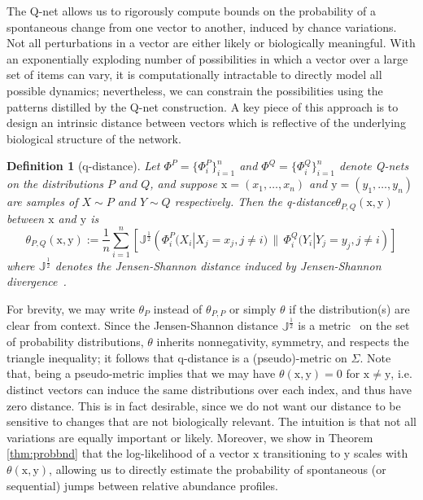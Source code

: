 \documentclass[onecolumn,10pt]{IEEEtran}
\newtheorem{defn}{Definition}
\def\x{\bm{\mathrm{x}}}
\def\y{\bm{\mathrm{y}}}
\def\qnet{Q-net\xspace}
\def\qdist{q-distance\xspace}
\def\x{\bm{\mathrm{x}}}
\def\y{\bm{\mathrm{y}}}
\begin{document}
The \qnet allows us to rigorously compute  bounds on  the probability of a spontaneous change from one vector to another, induced by chance variations. Not all perturbations in a vector are either likely or biologically meaningful. With an exponentially exploding number of possibilities in which a vector over a large set of items can vary, it is computationally intractable to directly model all possible dynamics; nevertheless, we can constrain the possibilities using the patterns distilled by the \qnet construction.  A key piece of this approach is to design  an intrinsic distance between vectors which is reflective of the underlying biological structure of the network.  

\begin{defn}[\qdist]
\label{defqdistance}
Let $\Phi^P = \{\Phi_i^P\}_{i=1}^n$ and $\Phi^Q = \{\Phi_i^Q\}_{i=1}^n$ denote {\qnet}s on the distributions $P$ and $Q$, and suppose $\x=(x_1, \ldots, x_n)$ and $\y =(y_1, \ldots, y_n)$ are samples of $X \sim P$ and $Y \sim Q$ respectively. Then the \qdist $\theta_{P,Q}(\x,\y)$ between $\x$ and $\y$ is\[\theta_{P,Q}(\x,\y) := \frac{1}{n}\sum_{i=1}^n \left[ \mathbb{J}^{\frac{1}{2}} \left(\Phi_i^P(X_i |X_j = x_j, j \neq i) \,\|\, \Phi_i^Q(Y_i|Y_j = y_j, j \neq i\right ) \right]\]%
where $\mathbb{J}^{\frac{1}{2}}$ denotes the Jensen-Shannon distance induced by Jensen-Shannon divergence~\cite{cover1991elements}.
\end{defn}

For brevity, we may write $\theta_P$ instead of $\theta_{P,P}$ or simply $\theta$ if the distribution(s) are clear from context.  Since the Jensen-Shannon distance $\mathbb{J}^{\frac{1}{2}}$ is a metric~\cite{fuglede2004jensen} on the set of probability distributions, $\theta$ inherits nonnegativity, symmetry, and respects the triangle inequality; it follows that \qdist is a (pseudo)-metric on $\Sigma$. Note that, being a pseudo-metric implies that  we may have $\theta(\x, \y) = 0$ for $\x \neq \y$, i.e. distinct vectors can induce the same distributions over each index, and thus have zero distance. This is in fact desirable, since we do  not want  our distance to be sensitive to changes that are not biologically relevant.  The intuition is that not all variations are equally important or likely.    Moreover, we show in Theorem \ref{thm:probbnd} that the log-likelihood of a vector $\x$ transitioning to $\y$ scales with $\theta(\x,\y)$, allowing us to directly estimate the probability of spontaneous (or sequential) jumps between relative abundance profiles.
\end{document}
